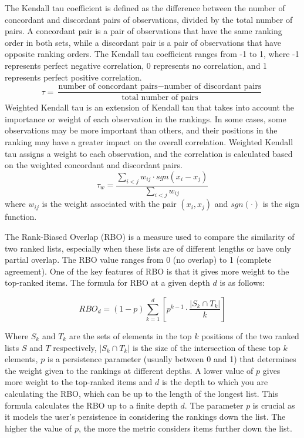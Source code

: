 The Kendall tau coefficient \cite{kendallTreatmentTiesRanking1945} is defined as the difference between the number of concordant and discordant pairs of observations, divided by the total number of pairs. A concordant pair is a pair of observations that have the same ranking order in both sets, while a discordant pair is a pair of observations that have opposite ranking orders. The Kendall tau coefficient ranges from -1 to 1, where -1 represents perfect negative correlation, 0 represents no correlation, and 1 represents perfect positive correlation. 
\[
\tau = \frac{{\text{{number of concordant pairs}} - \text{{number of discordant pairs}}}}{{\text{{total number of pairs}}}}
\]
Weighted Kendall tau  \cite{vignaWeightedCorrelationIndex2015} is an extension of Kendall tau that takes into account the importance or weight of each observation in the rankings. In some cases, some observations may be more important than others, and their positions in the ranking may have a greater impact on the overall correlation. Weighted Kendall tau assigns a weight to each observation, and the correlation is calculated based on the weighted concordant and discordant pairs.
\[
\tau_w = \frac{{\sum_{i<j} w_{ij} \cdot sgn(x_i - x_j)}}{{\sum_{i<j} w_{ij}}}
\]
where $w_{ij}$ is the weight associated with the pair $(x_i, x_j)$ and $sgn(\cdot)$ is the sign function.

The Rank-Biased Overlap (RBO) \cite{webberSimilarityMeasureIndefinite2010} is a measure used to compare the similarity of two ranked lists, especially when these lists are of different lengths or have only partial overlap. The RBO value ranges from 0 (no overlap) to 1 (complete agreement). One of the key features of RBO is that it gives more weight to the top-ranked items. The formula for RBO at a given depth \( d \) is as follows:

\[
RBO_d = (1 - p) \sum_{k=1}^{d} \left[ p^{k-1} \cdot \frac{|S_{k} \cap T_{k}|}{k} \right]
\]

Where  \( S_{k} \) and \( T_{k} \) are the sets of elements in the top \( k \) positions of the two ranked lists \( S \) and \( T \) respectively, \( |S_{k} \cap T_{k}| \) is the size of the intersection of these top \( k \) elements, \( p \) is a persistence parameter (usually between 0 and 1) that determines the weight given to the rankings at different depths. A lower value of \( p \) gives more weight to the top-ranked items and \( d \) is the depth to which you are calculating the RBO, which can be up to the length of the longest list. This formula calculates the RBO up to a finite depth \( d \). The parameter \( p \) is crucial as it models the user's persistence in considering the rankings down the list. The higher the value of \( p \), the more the metric considers items further down the list. 

